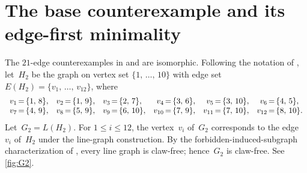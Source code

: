 \documentclass[11pt]{amsart}
\numberwithin{equation}{section}
\theoremstyle{remark}
\newcommand{\Gtwo}{G_{2}}
\begin{document}
\section{The base counterexample and its edge-first minimality}
\label{sec:edge-first-minimality}
The $21$-edge counterexamples in
\citet[Proposition~4]{Prajapati2026} and \citet{MM2026} are isomorphic.
Following the notation of \citet{MM2026}, let~$H_2$ be the graph on
vertex set
$\{1,\,\dots,\,10\}$ with edge set
$E(H_2)=\{v_1,\,\dots,\,v_{12}\}$, where
\[
\begin{array}{r@{\,=\,}l r@{\,=\,}l r@{\,=\,}l r@{\,=\,}l
                r@{\,=\,}l r@{\,=\,}l}
v_1 & \{1,\,8\}, & v_2 & \{1,\,9\}, & v_3 & \{2,\,7\}, &
v_4 & \{3,\,6\}, & v_5 & \{3,\,10\}, & v_6 & \{4,\,5\},\\
v_7 & \{4,\,9\}, & v_8 & \{5,\,9\}, & v_9 & \{6,\,10\}, &
v_{10} & \{7,\,9\}, & v_{11} & \{7,\,10\}, & v_{12} & \{8,\,10\}.
\end{array}
\]
Let~$\Gtwo=L(H_2)$.  For $1\le i\le12$, the vertex~$v_i$ of~$\Gtwo$
corresponds to the edge~$v_i$ of~$H_2$ under the line-graph construction.
By the
forbidden-induced-subgraph characterization of \citet{Beineke1970}, every
line graph is claw-free; hence~$\Gtwo$ is claw-free.
See \cref{fig:G2}.
\end{document}
